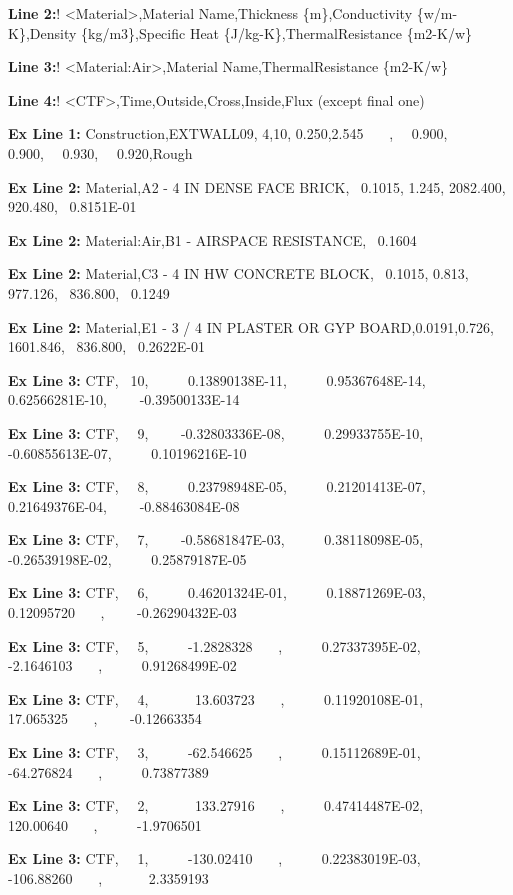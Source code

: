 \textbf{Line 2:}! \textless{}Material\textgreater{},Material Name,Thickness \{m\},Conductivity \{w/m-K\},Density \{kg/m3\},Specific Heat \{J/kg-K\},ThermalResistance \{m2-K/w\}

\textbf{Line 3:}! \textless{}Material:Air\textgreater{},Material Name,ThermalResistance \{m2-K/w\}

\textbf{Line 4:}! \textless{}CTF\textgreater{},Time,Outside,Cross,Inside,Flux (except final one)

\textbf{Ex Line 1:} Construction,EXTWALL09, 4,10, 0.250,2.545~~~ ,~~ 0.900,~~ 0.900,~~ 0.930,~~ 0.920,Rough

\textbf{Ex Line 2:} Material,A2 - 4 IN DENSE FACE BRICK,~ 0.1015, 1.245, 2082.400, 920.480,~ 0.8151E-01

\textbf{Ex Line 2:} Material:Air,B1 - AIRSPACE RESISTANCE,~ 0.1604

\textbf{Ex Line 2:} Material,C3 - 4 IN HW CONCRETE BLOCK,~ 0.1015, 0.813,~ 977.126,~ 836.800,~ 0.1249

\textbf{Ex Line 2:} Material,E1 - 3 / 4 IN PLASTER OR GYP BOARD,0.0191,0.726, 1601.846,~ 836.800,~ 0.2622E-01

\textbf{Ex Line 3:} CTF,~ 10,~~~~~ 0.13890138E-11,~~~~~ 0.95367648E-14,~~~~~ 0.62566281E-10,~~~~ -0.39500133E-14

\textbf{Ex Line 3:} CTF,~~ 9,~~~~ -0.32803336E-08,~~~~~ 0.29933755E-10,~~~~ -0.60855613E-07,~~~~~ 0.10196216E-10

\textbf{Ex Line 3:} CTF,~~ 8,~~~~~ 0.23798948E-05,~~~~~ 0.21201413E-07,~~~~~ 0.21649376E-04,~~~~ -0.88463084E-08

\textbf{Ex Line 3:} CTF,~~ 7,~~~~ -0.58681847E-03,~~~~~ 0.38118098E-05,~~~~ -0.26539198E-02,~~~~~ 0.25879187E-05

\textbf{Ex Line 3:} CTF,~~ 6,~~~~~ 0.46201324E-01,~~~~~ 0.18871269E-03,~~~~~ 0.12095720~~~ ,~~~~ -0.26290432E-03

\textbf{Ex Line 3:} CTF,~~ 5,~~~~~ -1.2828328~~~ ,~~~~~ 0.27337395E-02,~~~~~ -2.1646103~~~ ,~~~~~ 0.91268499E-02

\textbf{Ex Line 3:} CTF,~~ 4,~~~~~~ 13.603723~~~ ,~~~~~ 0.11920108E-01,~~~~~~ 17.065325~~~ ,~~~~ -0.12663354

\textbf{Ex Line 3:} CTF,~~ 3,~~~~~ -62.546625~~~ ,~~~~~ 0.15112689E-01,~~~~~ -64.276824~~~ ,~~~~~ 0.73877389

\textbf{Ex Line 3:} CTF,~~ 2,~~~~~~ 133.27916~~~ ,~~~~~ 0.47414487E-02,~~~~~~ 120.00640~~~ ,~~~~~ -1.9706501

\textbf{Ex Line 3:} CTF,~~ 1,~~~~~ -130.02410~~ ~,~~~~~ 0.22383019E-03,~~~~~ -106.88260~~~ ,~~~~~~ 2.3359193

